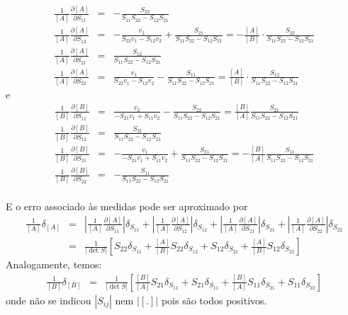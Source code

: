 \begin{resol}
\begin{eqnarray*}
\frac{1}{[ A ]}\frac{\partial [ A ]}{\partial S_{11}}&=&-\frac{S_{22}}{S_{11}S_{22}-S_{12}S_{21}}\\
\frac{1}{[ A ]}\frac{\partial [ A ]}{\partial S_{12}}&=&-\frac{v_2}{S_{22}v_1-S_{12}v_2}+\frac{S_{21}}{S_{11}S_{22}-S_{12}S_{21}}=-\frac{[A]}{\left[B\right]}\cdot \frac{S_{22}}{S_{11}S_{22}-S_{12}S_{21}}\\
\frac{1}{[ A ]}\frac{\partial [ A ]}{\partial S_{21}}&=&\frac{S_{12}}{S_{11}S_{22}-S_{12}S_{21}}\\
\frac{1}{[ A ]}\frac{\partial [ A ]}{\partial S_{22}}&=&\frac{v_1}{S_{22}v_1-S_{12}v_2}-\frac{S_{11}}{S_{11}S_{22}-S_{12}S_{21}}=\frac{[A]}{\left[B\right]}\cdot \frac{S_{12}}{S_{11}S_{22}-S_{12}S_{21}}
\end{eqnarray*}
e
\begin{eqnarray*}
\frac{1}{\left[ B \right]}\frac{\partial \left[ B \right]}{\partial S_{11}}&=&\frac{v_2}{-S_{21}v_1+S_{11}v_2}-\frac{S_{22}}{S_{11}S_{22}-S_{12}S_{21}}=\frac{\left[B\right]}{[A]} \frac{S_{21}}{S_{11}S_{22}-S_{12}S_{21}}\\
\frac{1}{\left[ B \right]}\frac{\partial \left[ B \right]}{\partial S_{12}}&=&\frac{S_{21}}{S_{11}S_{22}-S_{12}S_{21}}\\
\frac{1}{\left[ B \right]}\frac{\partial \left[ B \right]}{\partial S_{21}}&=&-\frac{v_1}{-S_{21}v_1+S_{11}v_2}+\frac{S_{21}}{S_{11}S_{22}-S_{12}S_{21}}=-\frac{\left[B\right]}{[A]}\frac{S_{11}}{S_{11}S_{22}-S_{12}S_{21}}\\
\frac{1}{\left[ B \right]}\frac{\partial \left[ B \right]}{\partial S_{22}}&=&-\frac{S_{11}}{S_{11}S_{22}-S_{12}S_{21}}\\
\end{eqnarray*}

E o erro associado às medidas pode ser aproximado por
\begin{eqnarray*}
\frac{1}{[A]}\delta_{[A]}&=&\left|\frac{1}{[ A ]}\frac{\partial [ A ]}{\partial S_{11}}\right| \delta_{S_{11}}+\left|\frac{1}{[ A ]}\frac{\partial [ A ]}{\partial S_{12}}\right| \delta_{S_{12}}+\left|\frac{1}{[ A ]}\frac{\partial [ A ]}{\partial S_{21}}\right| \delta_{S_{21}}+\left|\frac{1}{[ A ]}\frac{\partial [ A ]}{\partial S_{22}}\right| \delta_{S_{22}}\\
&=&\frac{1}{\left|\det{S}\right|}\left[S_{22}\delta_{S_{11}}+\frac{[A]}{\left[B\right]}S_{22}\delta_{S_{12}}+S_{12}\delta_{S_{21}}+\frac{[A]}{\left[B\right]}S_{12}\delta_{S_{22}}\right]
\end{eqnarray*}
Analogamente, temos:
\begin{eqnarray*}
\frac{1}{[B]}\delta_{[B]}&=&\frac{1}{\left|\det{S}\right|}\left[\frac{[B]}{\left[A\right]}S_{21}\delta_{S_{11}}+S_{21}\delta_{S_{11}}+\frac{\left[B\right]}{[A]}S_{11}\delta_{S_{21}}+S_{11}\delta_{S_{22}}\right]
\end{eqnarray*}
onde não se indicou $|S_{ij}|$ nem $|[.]|$ pois são todos positivos.



\end{resol}

